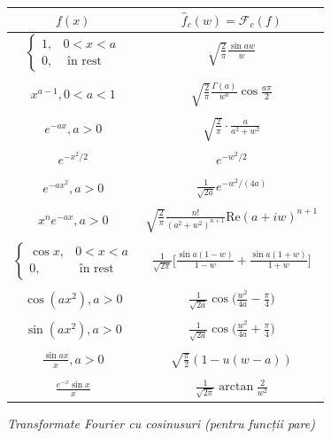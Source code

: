 \documentclass[12pt,a4paper]{article}
\newcommand\kal{\mathcal}
\theoremstyle{dotless}
\theoremstyle{dotlessdr}
\begin{document}
\begin{figure}[!htbp]
  \centering
  \begin{tabular}{c | c}
    $ f(x) $ & $ \widehat{f}_c(w) = \kal{F}_c(f) $ \\
    \hline\hline
    $ \begin{cases} 1, & 0 < x < a \\ 0, &\text{ în rest} \end{cases} $ & $ \sqrt{\frac{2}{\pi}} \frac{\sin aw}{w} $ \\
             & \\
    $ x^{a-1}, 0 < a < 1 $ & $ \sqrt{\frac{2}{\pi}} \frac{\Gamma(a)}{w^a} \cos \frac{a\pi}{2} $ \\
             & \\
    $ e^{-ax}, a > 0 $ & $ \sqrt{\frac{2}{\pi}} \cdot \frac{a}{a^2 + w^2} $ \\
             & \\
    $ e^{-x^2/2} $ & $ e^{-w^2/2} $ \\
             & \\
    $ e^{-ax^2}, a > 0 $ & $ \frac{1}{\sqrt{2a}} e^{-w^2/(4a)} $ \\
             & \\
    $ x^n e^{-ax}, a > 0 $ & $ \sqrt{\frac{2}{\pi}} \frac{n!}{(a^2 + w^2)^{n+1}} \mathrm{Re}(a + iw)^{n+1} $ \\
             & \\
    $ \begin{cases} \cos x, & 0 < x < a \\ 0, & \text{ în rest} \end{cases} $ & $ \frac{1}{\sqrt{2\pi}} \Big[ \frac{\sin a(1 - w)}{1 - w} + \frac{\sin a(1 + w)}{1 + w} \Big] $ \\
             & \\
    $ \cos (ax^2), a > 0 $ & $ \frac{1}{\sqrt{2a}} \cos \Big( \frac{w^2}{4a} - \frac{\pi}{4} \Big) $ \\
             & \\
    $ \sin (ax^2), a > 0 $ & $ \frac{1}{\sqrt{2a}} \cos \Big( \frac{w^2}{4a} + \frac{\pi}{4} \Big) $ \\
             & \\
    $ \frac{\sin ax}{x}, a > 0 $ & $ \sqrt{\frac{\pi}{2}} (1 - u(w - a)) $\footnotemark \\
             & \\
    $ \frac{e^{-x} \sin x}{x} $ & $ \frac{1}{\sqrt{2\pi}} \arctan \frac{2}{w^2} $ \\
  \end{tabular}
  \caption{\emph{Transformate Fourier cu cosinusuri (pentru funcții pare)}}
\end{figure}
\end{document}
